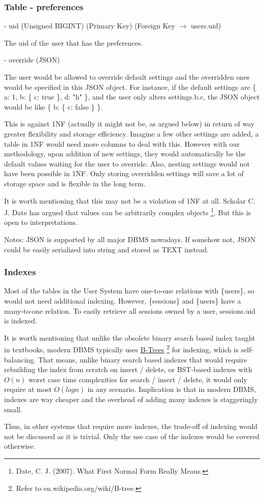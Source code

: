\documentclass[12pt]{report}
\newcommand{\n}{\par}
\newcommand{\br}{\n\vspace{1 em}\n}
\begin{document}
\subsubsection{Table - preferences} \label{data-layer.design.user-system.preferences}
- uid (Unsigned BIGINT) (Primary Key) (Foreign Key $\rightarrow$ users.uid)\n
The uid of the user that has the preferences.
\br
- override (JSON)\n
The user would be allowed to override default settings and the overridden ones would be specified in this JSON object.
For instance, if the default settings are \{ a: 1, b: \{ c: true \}, d: "h" \},
and the user only alters settings.b.c, the JSON object would be like \{ b: \{ c: false \} \}.\n
This is against 1NF (actually it might not be, as argued below) in return of way greater flexibility and storage efficiency.
Imagine a few other settings are added, a table in 1NF would need more columns to deal with this.
However with our methodology, upon addition of new settings, they would automatically be the default values waiting for the user to override.
Also, nesting settings would not have been possible in 1NF.
Only storing overridden settings will save a lot of storage space and is flexible in the long term.\n
It is worth mentioning that this may not be a violation of 1NF at all.
Scholar C. J. Date has argued that values can be arbitrarily complex objects
\footnote{Date, C. J. (2007). What First Normal Form Really Means.}.
But this is open to interpretations.\n
Notes: JSON is supported by all major DBMS nowadays. If somehow not, JSON could be easily serialized into string and stored as TEXT instead.

\subsubsection{Indexes} \label{data-layer.design.user-system.indexes}
Most of the tables in the User System have one-to-one relations with \{users\},
so would not need additional indexing.
However, \{sessions\} and \{users\} have a many-to-one relation.
To easily retrieve all sessions owned by a user, sessions.uid is indexed.\n
It is worth mentioning that unlike the obsolete binary search based index taught in textbooks, modern DBMS typically uses
\href{https://en.wikipedia.org/wiki/B-tree}{B-Trees}
\footnote{Refer to en.wikipedia.org/wiki/B-tree.}
for indexing, which is self-balancing.
That means, unlike binary search based indexes that would require rebuilding the index from scratch on insert / delete,
or BST-based indexes with $O(n)$ worst case time complexities for search / insert / delete,
it would only require at most $O(logn)$ in any scenario.
Implication is that in modern DBMS, indexes are way cheaper and the overhead of adding many indexes is staggeringly small.\n
Thus, in other systems that require more indexes, the trade-off of indexing would not be discussed as it is trivial.
Only the use case of the indexes would be covered otherwise.
\end{document}
